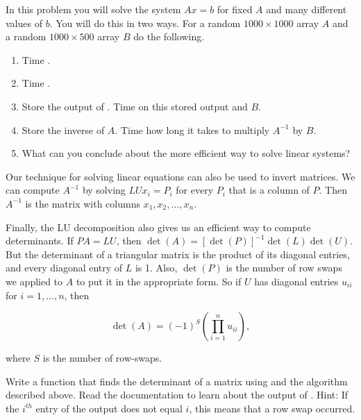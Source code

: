 \begin{problem}\label{prob:solve}
In this problem you will solve the system $Ax = b$ for fixed $A$ and many different values of $b$. 
You will do this in two ways. 
For a random $1000 \times 1000$ array $A$ and a random $1000 \times 500$ array $B$ do the following.
\begin{enumerate}
\item Time .
\item Time .
\item Store the output of . Time  on this stored output and $B$.
\item Store the inverse of $A$. Time how long it takes to multiply $A^{-1}$ by $B$.
\item What can you conclude about the more efficient way to solve linear systems?
\end{enumerate}
\end{problem}

Our technique for solving linear equations can also be used to invert matrices. 
We can compute $A^{-1}$ by solving $LUx_i = P_i$ for every $P_i$ that is a column of $P$. 
Then $A^{-1}$ is the matrix with columns $x_1, x_2, \ldots, x_n$. 

Finally, the LU decomposition also gives us an efficient way to compute determinants. 
If $PA=LU$, then $\det(A) = [\det(P)]^{-1}\det(L)\det(U)$. 
But the determinant of a triangular matrix is the product of its diagonal entries, and every diagonal entry of $L$ is 1. 
Also, $\det(P)$ is the number of row swaps we applied to $A$ to put it in the appropriate form. 
So if $U$ has diagonal entries $u_{ii}$ for $i=1, \ldots, n$, then

\[
\det(A) = (-1)^S\left(\displaystyle\prod_{i=1}^nu_{ii}\right),
\]

where $S$ is the number of row-swaps.

%

\begin{problem}
\label{prob:det}
Write a function that finds the determinant of a matrix using  and the algorithm described above. 
Read the documentation to learn about the output of .
Hint: If the $i^{th}$ entry of the output  does not equal $i$, this means that a row swap occurred.
\end{problem}

